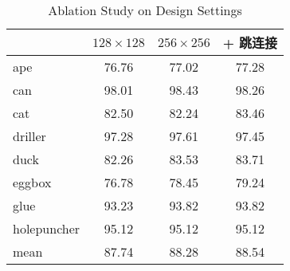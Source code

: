 \begin{table}
    \centering
    \caption{Ablation Study on Design Settings}
    \begin{tabular}{lccc}
    \toprule 
    & $128\times128$ & $256\times256$ & + 跳连接 \\
    \midrule
    ape & 76.76 & 77.02 & 77.28 \\
    can & 98.01 & 98.43 & 98.26 \\
    cat & 82.50 & 82.24 & 83.46 \\
    driller & 97.28 & 97.61 & 97.45 \\
    duck & 82.26 & 83.53 & 83.71 \\
    eggbox & 76.78 & 78.45 & 79.24 \\
    glue & 93.23 & 93.82 & 93.82 \\
    holepuncher & 95.12 & 95.12 & 95.12 \\
    \midrule
    mean & 87.74 & 88.28 & 88.54 \\
    \bottomrule
  \end{tabular}
  \label{tab:main_ablation}
\end{table}